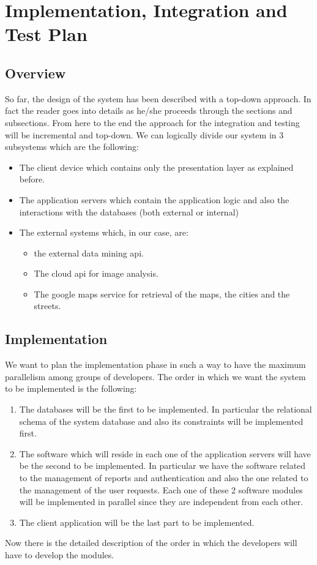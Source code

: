 \documentclass[titlepage]{article}
\begin{document}
\section{Implementation, Integration and Test Plan}
\subsection{Overview}
So far, the design of the system has been described with a top-down approach. In fact the reader goes into details as he/she proceeds through the sections and subsections. From here to the end the approach for the integration and testing will be incremental and top-down. We can logically divide our system in 3 subsystems which are the following:

\begin{itemize}
	\item The client device which contains only the presentation layer as explained before.
	\item The application servers which contain the application logic and also the interactions with the databases (both external or internal)
	\item The external systems which, in our case, are:
	\begin{itemize}
		\item the external data mining api.
		\item The cloud api for image analysis.
		\item The google maps service for retrieval of the maps, the cities and the streets.
	\end{itemize}
\end{itemize} 

\subsection{Implementation}
We want to plan the implementation phase in such a way to have the maximum parallelism among groups of developers.
The order in which we want the system to be implemented is the following:

\begin{enumerate}

	\item The databases will be the first to be implemented. In particular the relational schema of the system database and also its constraints will be implemented first.
	\item The software which will reside in each one of the application servers will have be the second to be implemented. In particular we have the software related to the management of reports and authentication and also the one related to the management of the user requests. Each one of these 2 software modules will be implemented in parallel since they are independent from each other.
	\item The client application will be the last part to be implemented.\\
		
\end{enumerate}
Now there is the detailed description of the order in which the developers will have to develop the modules.
	
\end{document}
